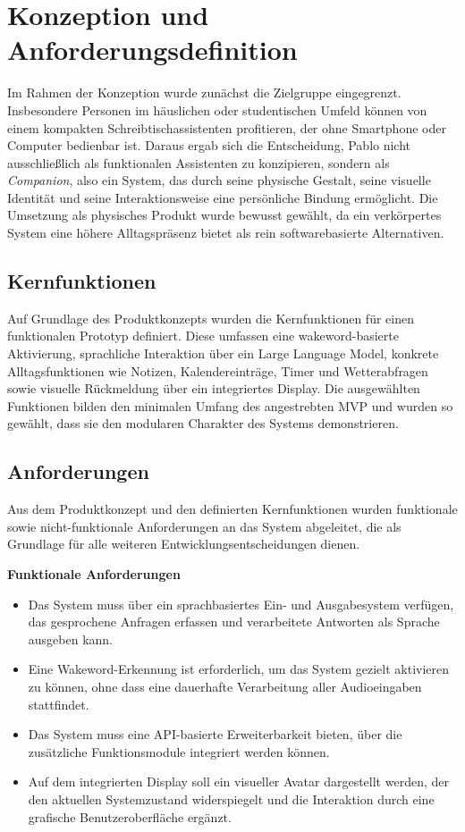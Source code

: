 \section{Konzeption und Anforderungsdefinition}

Im Rahmen der Konzeption wurde zunächst die Zielgruppe eingegrenzt.
Insbesondere Personen im häuslichen oder studentischen Umfeld können von einem kompakten Schreibtischassistenten profitieren, der ohne Smartphone oder Computer bedienbar ist.
Daraus ergab sich die Entscheidung, Pablo nicht ausschließlich als funktionalen Assistenten zu konzipieren, sondern als \textit{Companion}, also ein System, das durch seine physische Gestalt, seine visuelle Identität und seine Interaktionsweise eine persönliche Bindung ermöglicht.
Die Umsetzung als physisches Produkt wurde bewusst gewählt, da ein verkörpertes System eine höhere Alltagspräsenz bietet als rein softwarebasierte Alternativen.

\subsection{Kernfunktionen}

Auf Grundlage des Produktkonzepts wurden die Kernfunktionen für einen funktionalen Prototyp definiert.
Diese umfassen eine wakeword-basierte Aktivierung, sprachliche Interaktion über ein Large Language Model, konkrete Alltagsfunktionen wie Notizen, Kalendereinträge, Timer und Wetterabfragen sowie visuelle Rückmeldung über ein integriertes Display.
Die ausgewählten Funktionen bilden den minimalen Umfang des angestrebten MVP und wurden so gewählt, dass sie den modularen Charakter des Systems demonstrieren.

\subsection{Anforderungen}

Aus dem Produktkonzept und den definierten Kernfunktionen wurden funktionale sowie nicht-funktionale Anforderungen an das System abgeleitet, die als Grundlage für alle weiteren Entwicklungsentscheidungen dienen.

\textbf{Funktionale Anforderungen}
\begin{itemize}
    \item Das System muss über ein sprachbasiertes Ein- und Ausgabesystem verfügen, das gesprochene Anfragen erfassen und verarbeitete Antworten als Sprache ausgeben kann.
    \item Eine Wakeword-Erkennung ist erforderlich, um das System gezielt aktivieren zu können, ohne dass eine dauerhafte Verarbeitung aller Audioeingaben stattfindet.
    \item Das System muss eine API-basierte Erweiterbarkeit bieten, über die zusätzliche Funktionsmodule integriert werden können.
    \item Auf dem integrierten Display soll ein visueller Avatar dargestellt werden, der den aktuellen Systemzustand widerspiegelt und die Interaktion durch eine grafische Benutzeroberfläche ergänzt.
\end{itemize}

